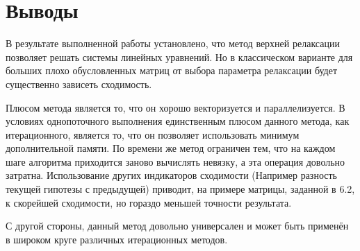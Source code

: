 \newpage
\section{Выводы}
В результате выполненной работы установлено, что метод верхней релаксации позволяет решать системы линейных уравнений.
Но в классическом варианте для больших плохо обусловленных матриц от выбора параметра релаксации будет существенно зависеть сходимость.
\par

Плюсом метода является то, что он хорошо векторизуется и параллелизуется. В условиях однопоточного выполнения единственным плюсом данного
метода, как итерационного, является то, что он позволяет использовать минимум дополнительной памяти.
По времени же метод ограничен тем, что на каждом шаге алгоритма приходится заново вычислять невязку, а эта операция довольно затратна.
Использование других индикаторов сходимости (Например разность текущей гипотезы с предыдущей) приводит, на примере матрицы, заданной в 6.2,
к скорейшей сходимости, но гораздо меньшей точности результата.
\par

С другой стороны, данный метод довольно универсален и может быть применён в широком круге различных итерационных методов.
